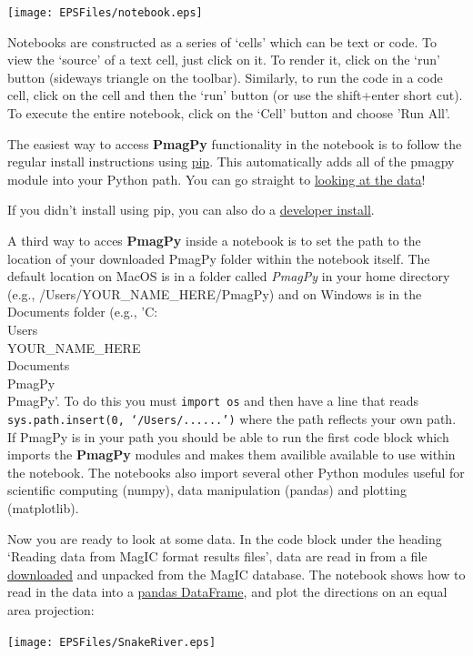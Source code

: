 \documentclass[11pt]{book}
\begin{document}
{{{\texttt{[image: EPSFiles/notebook.eps]}

Notebooks are constructed as a series of `cells' which can be text or code.  To view the `source' of a text cell, just click on it.  To render it, click on the `run' button (sideways triangle on the toolbar).  Similarly, to run the code in a code cell, click on the cell and then the `run' button (or use the shift+enter short cut).   To execute the entire notebook, click on the `Cell' button and choose 'Run All'.

The easiest way to access {\bf PmagPy} functionality in the notebook is to follow the regular install instructions using \href{#pip_install}{pip}.  This automatically adds all of the pmagpy module into your Python path.  You can go straight to \href{#notebook_start}{looking at the data}!

If you didn't install using pip, you can also do a \href{#developer_install}{developer install}.

A third way to acces {\bf PmagPy} inside a notebook is to set the path to the location of your downloaded PmagPy folder within the notebook itself. The default location on  MacOS is in a folder called {\it PmagPy} in your home directory (e.g., /Users/YOUR\_NAME\_HERE/PmagPy) and on Windows is in the Documents folder (e.g., 'C:\\Users\\YOUR\_NAME\_HERE\\Documents\\PmagPy\\PmagPy'. To do this you must \texttt{import os} and then have a line that reads \texttt{sys.path.insert(0, `/Users/......')} where the path reflects your own path.   If PmagPy is in your path you should be able to run the first code block which imports the {\bf PmagPy} modules and makes them availible available to use within the notebook.  The notebooks also import several other Python modules useful for scientific computing (numpy),  data manipulation (pandas) and plotting (matplotlib).

 Now you are ready to look at some data.  In the code block under the heading `Reading data from MagIC format results files',  data are read in from a file \href{#magic_download}{downloaded} and unpacked from the MagIC database.   The notebook shows how to read in the data into a \href{#pandas}{pandas DataFrame}, and plot the directions on an equal area projection:

\texttt{[image: EPSFiles/SnakeRiver.eps]}

}}}
\end{document}
